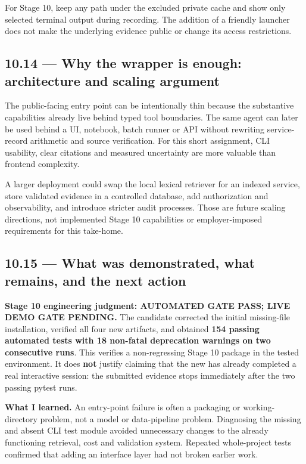 \documentclass[11pt,a4paper]{article}
\DeclareRobustCommand{\code}[1]{{\ttfamily\small\detokenize{#1}}}
\begin{document}
For Stage 10, keep any \code{--session-log} path under the excluded private cache and show only selected terminal output during recording. The addition of a friendly \code{main.py} launcher does not make the underlying evidence public or change its access restrictions.

\subsection{10.14 --- Why the wrapper is enough: architecture and scaling argument}
The public-facing entry point can be intentionally thin because the substantive capabilities already live behind typed tool boundaries. The same agent can later be used behind a UI, notebook, batch runner or API without rewriting service-record arithmetic and source verification. For this short assignment, CLI usability, clear citations and measured uncertainty are more valuable than frontend complexity.

A larger deployment could swap the local lexical retriever for an indexed service, store validated evidence in a controlled database, add authorization and observability, and introduce stricter audit processes. Those are future scaling directions, not implemented Stage 10 capabilities or employer-imposed requirements for this take-home.

\subsection{10.15 --- What was demonstrated, what remains, and the next action}
\begin{keybox}
\textbf{Stage 10 engineering judgment: AUTOMATED GATE PASS; LIVE DEMO GATE PENDING.} The candidate corrected the initial missing-file installation, verified all four new artifacts, and obtained \textbf{154 passing automated tests with 18 non-fatal deprecation warnings on two consecutive runs}. This verifies a non-regressing Stage 10 package in the tested environment. It does \textbf{not} justify claiming that the new \code{main.py} has already completed a real interactive session: the submitted evidence stops immediately after the two passing pytest runs.
\end{keybox}

\textbf{What I learned.} An entry-point failure is often a packaging or working-directory problem, not a model or data-pipeline problem. Diagnosing the missing \code{main.py} and absent CLI test module avoided unnecessary changes to the already functioning retrieval, cost and validation system. Repeated whole-project tests confirmed that adding an interface layer had not broken earlier work.
\end{document}
